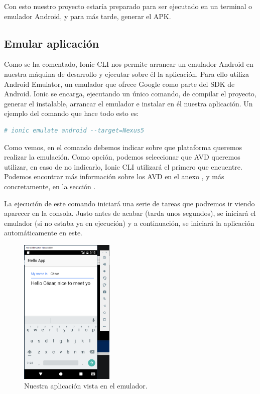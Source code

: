 Con esto nuestro proyecto estaría preparado para ser ejecutado en un terminal o emulador Android, y para más tarde, generar el \gls{APK}.

\subsection{Emular aplicación}

Como se ha comentado, Ionic CLI nos permite arrancar un emulador Android en nuestra máquina de desarrollo y ejecutar sobre él la aplicación. Para ello utiliza Android Emulator, un emulador que ofrece Google como parte del \gls{SDK} de Android. Ionic se encarga, ejecutando un único comando, de compilar el proyecto, generar el instalable, arrancar el emulador e instalar en él nuestra aplicación. Un ejemplo del comando que hace todo esto es:

\begin{lstlisting}[language=bash]
  # ionic emulate android --target=Nexus5
\end{lstlisting}

Como vemos, en el comando debemos indicar sobre que plataforma queremos realizar la emulación. Como opción, podemos seleccionar que \gls{AVD} queremos utilizar, en caso de no indicarlo, Ionic CLI utilizará el primero que encuentre. Podemos encontrar más información sobre los \gls{AVD} en el anexo , y más concretamente, en la sección .

La ejecución de este comando iniciará una serie de tareas que podremos ir viendo aparecer en la consola. Justo antes de acabar (tarda unos segundos), se iniciará el emulador (si no estaba ya en ejecución) y a continuación, se iniciará la aplicación automáticamente en este.

\begin{figure}[H]
\centering
    \centering
        \includegraphics[width=0.4\textwidth]{Figures/ch2/BuildAndEmulate/landscape_emulator}
    \caption{Nuestra aplicación vista en el emulador.}
\end{figure}


